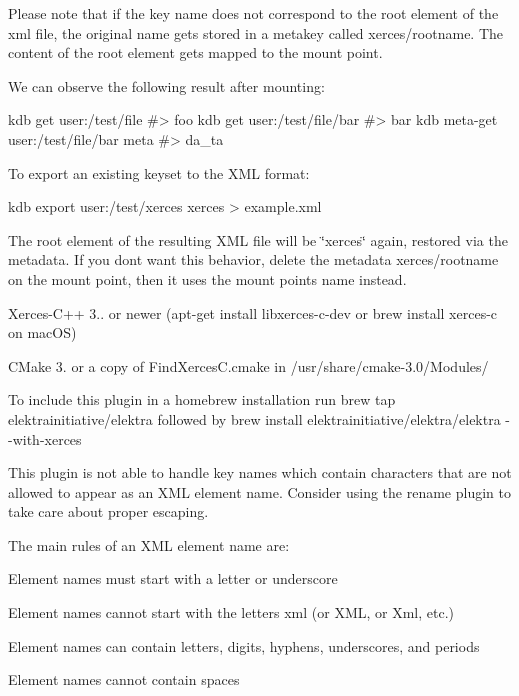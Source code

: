 Please note that if the key name does not correspond to the root element of the xml file, the original name gets stored in a metakey called {\ttfamily xerces/rootname}. The content of the root element gets mapped to the mount point.

We can observe the following result after mounting\+:


\begin{DoxyCode}
kdb get user:/test/file
#> foo
kdb get user:/test/file/bar
#> bar
kdb meta-get user:/test/file/bar meta
#> da\_ta
\end{DoxyCode}


To export an existing keyset to the X\+ML format\+:


\begin{DoxyCode}
kdb export user:/test/xerces xerces > example.xml
\end{DoxyCode}


The root element of the resulting X\+ML file will be \char`\"{}xerces\char`\"{} again, restored via the metadata. If you don\textquotesingle{}t want this behavior, delete the metadata {\ttfamily xerces/rootname} on the mount point, then it uses the mount point\textquotesingle{}s name instead.


\begin{DoxyItemize}
\item {\ttfamily Xerces-\/\+C++ 3..} or newer ({\ttfamily apt-\/get install libxerces-\/c-\/dev} or {\ttfamily brew install xerces-\/c} on mac\+OS)
\item C\+Make 3. or a copy of {\ttfamily Find\+Xerces\+C.\+cmake} in {\ttfamily /usr/share/cmake-\/3.0/\+Modules/}
\end{DoxyItemize}

To include this plugin in a homebrew installation run {\ttfamily brew tap elektrainitiative/elektra} followed by {\ttfamily brew install elektrainitiative/elektra/elektra -\/-\/with-\/xerces}

This plugin is not able to handle key names which contain characters that are not allowed to appear as an X\+ML element name. Consider using the rename plugin to take care about proper escaping.

The main rules of an X\+ML element name are\+:


\begin{DoxyItemize}
\item Element names must start with a letter or underscore
\item Element names cannot start with the letters xml (or X\+ML, or Xml, etc.)
\item Element names can contain letters, digits, hyphens, underscores, and periods
\item Element names cannot contain spaces
\end{DoxyItemize}

